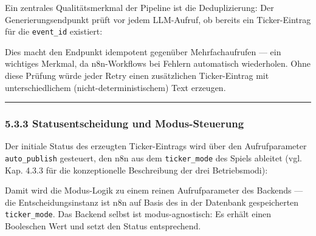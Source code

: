 Ein zentrales Qualitätsmerkmal der Pipeline ist die Deduplizierung: Der
Generierungsendpunkt prüft vor jedem LLM-Aufruf, ob bereits ein
Ticker-Eintrag für die \texttt{event\_id} existiert:

\begin{Shaded}
\begin{Highlighting}[]
\OperatorTok{=}
\end{Highlighting}
\end{Shaded}

Dies macht den Endpunkt idempotent gegenüber Mehrfachaufrufen --- ein
wichtiges Merkmal, da n8n-Workflows bei Fehlern automatisch wiederholen.
Ohne diese Prüfung würde jeder Retry einen zusätzlichen Ticker-Eintrag
mit unterschiedlichem (nicht-deterministischem) Text erzeugen.

\begin{center}\rule{0.5\linewidth}{0.5pt}\end{center}

\subsubsection{5.3.3 Statusentscheidung und
Modus-Steuerung}\label{statusentscheidung-und-modus-steuerung}

Der initiale Status des erzeugten Ticker-Eintrags wird über den
Aufrufparameter \texttt{auto\_publish} gesteuert, den n8n aus dem
\texttt{ticker\_mode} des Spiels ableitet (vgl. Kap. 4.3.3 für die
konzeptionelle Beschreibung der drei Betriebsmodi):

\begin{Shaded}
\begin{Highlighting}[]
\OperatorTok{=}
\end{Highlighting}
\end{Shaded}

Damit wird die Modus-Logik zu einem reinen Aufrufparameter des Backends
--- die Entscheidungsinstanz ist n8n auf Basis des in der Datenbank
gespeicherten \texttt{ticker\_mode}. Das Backend selbst ist
modus-agnostisch: Es erhält einen Booleschen Wert und setzt den Status
entsprechend.

